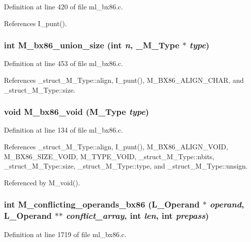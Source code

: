 Definition at line 420 of file ml\_\-bx86.c.

References I\_\-punt().
\subsubsection{\setlength{\rightskip}{0pt plus 5cm}int M\_\-bx86\_\-union\_\-size (int {\em n}, \bf{\_\-M\_\-Type} $\ast$ {\em type})}\label{ml__bx86_8c_455fff4924c59a257d94edd6f8d34f49}




Definition at line 453 of file ml\_\-bx86.c.

References \_\-struct\_\-M\_\-Type::align, I\_\-punt(), M\_\-BX86\_\-ALIGN\_\-CHAR, and \_\-struct\_\-M\_\-Type::size.
\subsubsection{\setlength{\rightskip}{0pt plus 5cm}void M\_\-bx86\_\-void (\bf{M\_\-Type} {\em type})}\label{ml__bx86_8c_add5ab9a34d587374f638a42b1e805a6}




Definition at line 134 of file ml\_\-bx86.c.

References \_\-struct\_\-M\_\-Type::align, I\_\-punt(), M\_\-BX86\_\-ALIGN\_\-VOID, M\_\-BX86\_\-SIZE\_\-VOID, M\_\-TYPE\_\-VOID, \_\-struct\_\-M\_\-Type::nbits, \_\-struct\_\-M\_\-Type::size, \_\-struct\_\-M\_\-Type::type, and \_\-struct\_\-M\_\-Type::unsign.

Referenced by M\_\-void().
\subsubsection{\setlength{\rightskip}{0pt plus 5cm}int M\_\-conflicting\_\-operands\_\-bx86 (L\_\-Operand $\ast$ {\em operand}, L\_\-Operand $\ast$$\ast$ {\em conflict\_\-array}, int {\em len}, int {\em prepass})}\label{ml__bx86_8c_4954ea2e9fd4bad8ff3bb50174c9fd7f}




Definition at line 1719 of file ml\_\-bx86.c.


